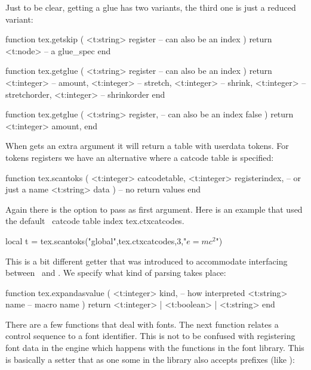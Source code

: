 Just to be clear, getting a glue has two variants, the third one is just a reduced variant:

\starttyping[option=LUA]
function tex.getskip (
    <t:string> register -- can also be an index
)
    return <t:node> -- a glue_spec
end

function tex.getglue (
    <t:string>  register -- can also be an index
)
    return
        <t:integer> -- amount,
        <t:integer> -- stretch,
        <t:integer> -- shrink,
        <t:integer> -- stretchorder,
        <t:integer> -- shrinkorder
end

function tex.getglue (
    <t:string> register, -- can also be an index
    false
)
    return <t:integer> amount,
end
\stoptyping

When  gets an extra argument  it will return a
table with userdata tokens. For tokens registers we have an alternative where a
catcode table is specified:

\starttyping[option=LUA]
function tex.scantoks (
    <t:integer> catcodetable,
    <t:integer> registerindex, -- or just a name
    <t:string>  data
)
    -- no return values
end
\stoptyping

Again there is the option to pass  as first argument. Here is an
example that used the default \CONTEXT\ catcode table index \typ
{tex.ctxcatcodes}.

\starttyping[option=LUA]
local t = tex.scantoks("global",tex.ctxcatcodes,3,"$e=mc^2$")
\stoptyping

This is a bit different getter that was introduced to accommodate interfacing
between \TEX\ and \METAPOST. We specify what kind of parsing takes place:

\starttyping[option=LUA]
function tex.expandasvalue (
    <t:integer> kind, -- how interpreted
    <t:string>  name  -- macro name
)
    return <t:integer> | <t:boolean> | <t:string>
end
\stoptyping

\startfourrows
{}
\stopfourrows

\stopsubsection

\startsubsection[title=Fonts]

There are a few functions that deal with fonts. The next function relates a
control sequence to a font identifier. This is not to be confused with
registering font data in the engine which happens with the functions in the \type
{font} library. This is basically a setter that as one some in the 
library also accepts prefixes (like ):

